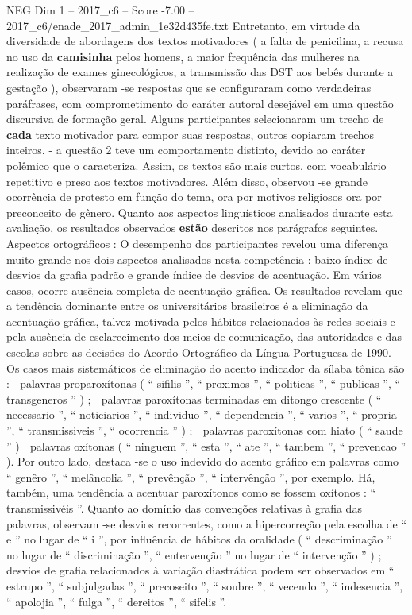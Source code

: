 \begin{textsample}{NEG Dim 1 – 2017\_c6 – Score -7.00 – 2017\_c6/enade\_2017\_admin\_1e32d435fe.txt}
Entretanto, em virtude da diversidade de abordagens dos textos motivadores ( a falta de penicilina, a recusa no uso da \textbf{camisinha} pelos homens, a maior frequência das mulheres na realização de exames ginecológicos, a transmissão das DST aos bebês durante a gestação ), observaram -se respostas que se configuraram como verdadeiras paráfrases, com comprometimento do caráter autoral desejável em uma questão discursiva de formação geral.
Alguns participantes selecionaram um trecho de \textbf{cada} texto motivador para compor suas respostas, outros copiaram trechos inteiros. - a questão 2 teve um comportamento distinto, devido ao caráter polêmico que o caracteriza.
Assim, os textos são mais curtos, com vocabulário repetitivo e preso aos textos motivadores.
Além disso, observou -se grande ocorrência de protesto em função do tema, ora por motivos religiosos ora por preconceito de gênero.
Quanto aos aspectos linguísticos analisados durante esta avaliação, os resultados observados \textbf{estão} descritos nos parágrafos seguintes.
Aspectos ortográficos : O desempenho dos participantes revelou uma diferença muito grande nos dois aspectos analisados nesta competência : baixo índice de desvios da grafia padrão e grande índice de desvios de acentuação.
Em vários casos, ocorre ausência completa de acentuação gráfica.
Os resultados revelam que a tendência dominante entre os universitários brasileiros é a eliminação da acentuação gráfica, talvez motivada pelos hábitos relacionados às redes sociais e pela ausência de esclarecimento dos meios de comunicação, das autoridades e das escolas sobre as decisões do Acordo Ortográfico da Língua Portuguesa de 1990.
Os casos mais sistemáticos de eliminação do acento indicador da sílaba tônica são :  palavras proparoxítonas ( “ sifilis ”, “ proximos ”, “ politicas ”, “ publicas ”, “ transgeneros ” ) ;  palavras paroxítonas terminadas em ditongo crescente ( “ necessario ”, “ noticiarios ”, “ individuo ”, “ dependencia ”, “ varios ”, “ propria ”, “ transmissiveis ”, “ ocorrencia ” ) ;  palavras paroxítonas com hiato ( “ saude ” )  palavras oxítonas ( “ ninguem ”, “ esta ”, “ ate ”, “ tambem ”, “ prevencao ” ).
Por outro lado, destaca -se o uso indevido do acento gráfico em palavras como “ genêro ”, “ melâncolia ”, “ prevênção ”, “ intervênção ”, por exemplo.
Há, também, uma tendência a acentuar paroxítonos como se fossem oxítonos : “ transmissivéis ”.
Quanto ao domínio das convenções relativas à grafia das palavras, observam -se desvios recorrentes, como a hipercorreção pela escolha de “ e ” no lugar de “ i ”, por influência de hábitos da oralidade ( “ descriminação ” no lugar de “ discriminação ”, “ entervenção ” no lugar de “ intervenção ” ) ; desvios de grafia relacionados à variação diastrática podem ser observados em “ estrupo ”, “ subjulgadas ”, “ precoseito ”, “ soubre ”, “ vecendo ”, “ indesencia ”, “ apolojia ”, “ fulga ”, “ dereitos ”, “ sifelis ”.

\end{textsample}
